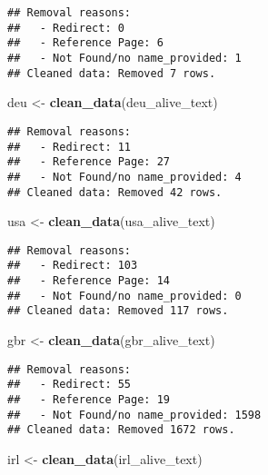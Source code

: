 \documentclass[
]{article}
\newenvironment{Shaded}{\begin{snugshade}}{\end{snugshade}}
\newcommand{\FunctionTok}[1]{\textcolor[rgb]{0.13,0.29,0.53}{\textbf{#1}}}
\newcommand{\NormalTok}[1]{#1}
\newcommand{\OtherTok}[1]{\textcolor[rgb]{0.56,0.35,0.01}{#1}}
\begin{document}
\begin{verbatim}
## Removal reasons:
##   - Redirect: 0 
##   - Reference Page: 6 
##   - Not Found/no name_provided: 1 
## Cleaned data: Removed 7 rows.
\end{verbatim}

\begin{Shaded}
\begin{Highlighting}[]
\NormalTok{deu }\OtherTok{\textless{}{-}} \FunctionTok{clean\_data}\NormalTok{(deu\_alive\_text)}
\end{Highlighting}
\end{Shaded}

\begin{verbatim}
## Removal reasons:
##   - Redirect: 11 
##   - Reference Page: 27 
##   - Not Found/no name_provided: 4 
## Cleaned data: Removed 42 rows.
\end{verbatim}

\begin{Shaded}
\begin{Highlighting}[]
\NormalTok{usa }\OtherTok{\textless{}{-}} \FunctionTok{clean\_data}\NormalTok{(usa\_alive\_text)}
\end{Highlighting}
\end{Shaded}

\begin{verbatim}
## Removal reasons:
##   - Redirect: 103 
##   - Reference Page: 14 
##   - Not Found/no name_provided: 0 
## Cleaned data: Removed 117 rows.
\end{verbatim}

\begin{Shaded}
\begin{Highlighting}[]
\NormalTok{gbr }\OtherTok{\textless{}{-}} \FunctionTok{clean\_data}\NormalTok{(gbr\_alive\_text)}
\end{Highlighting}
\end{Shaded}

\begin{verbatim}
## Removal reasons:
##   - Redirect: 55 
##   - Reference Page: 19 
##   - Not Found/no name_provided: 1598 
## Cleaned data: Removed 1672 rows.
\end{verbatim}

\begin{Shaded}
\begin{Highlighting}[]
\NormalTok{irl }\OtherTok{\textless{}{-}} \FunctionTok{clean\_data}\NormalTok{(irl\_alive\_text)}
\end{Highlighting}
\end{Shaded}
\end{document}
